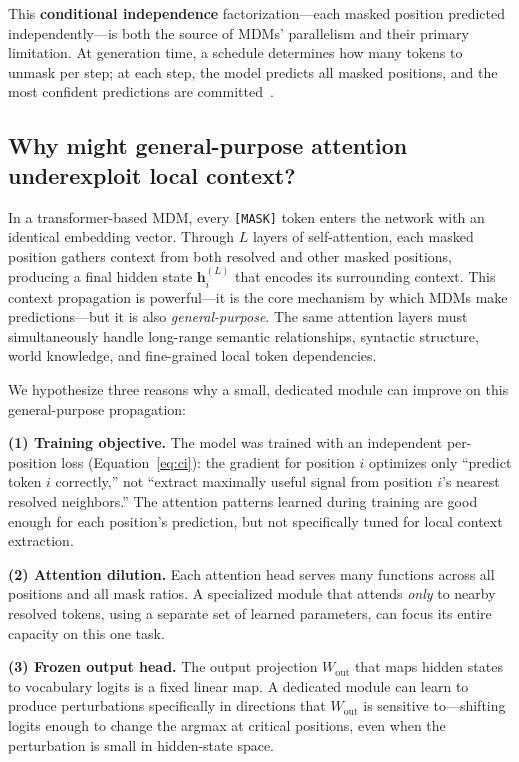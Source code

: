\documentclass{article} %
\begin{document}
This \textbf{conditional independence} factorization---each masked position predicted independently---is both the source of MDMs' parallelism and their primary limitation.
At generation time, a schedule determines how many tokens to unmask per step; at each step, the model predicts all masked positions, and the most confident predictions are committed~\citep{nie2025llada}.

\subsection{Why might general-purpose attention underexploit local context?}

In a transformer-based MDM, every \texttt{[MASK]} token enters the network with an identical embedding vector.
Through $L$ layers of self-attention, each masked position gathers context from both resolved and other masked positions, producing a final hidden state $\mathbf{h}_i^{(L)}$ that encodes its surrounding context.
This context propagation is powerful---it is the core mechanism by which MDMs make predictions---but it is also \emph{general-purpose}.
The same attention layers must simultaneously handle long-range semantic relationships, syntactic structure, world knowledge, and fine-grained local token dependencies.

We hypothesize three reasons why a small, dedicated module can improve on this general-purpose propagation:

\textbf{(1) Training objective.}
The model was trained with an independent per-position loss (Equation~\ref{eq:ci}): the gradient for position $i$ optimizes only ``predict token $i$ correctly,'' not ``extract maximally useful signal from position $i$'s nearest resolved neighbors.''
The attention patterns learned during training are good enough for each position's prediction, but not specifically tuned for local context extraction.

\textbf{(2) Attention dilution.}
Each attention head serves many functions across all positions and all mask ratios.
A specialized module that attends \emph{only} to nearby resolved tokens, using a separate set of learned parameters, can focus its entire capacity on this one task.

\textbf{(3) Frozen output head.}
The output projection $W_{\text{out}}$ that maps hidden states to vocabulary logits is a fixed linear map.
A dedicated module can learn to produce perturbations specifically in directions that $W_{\text{out}}$ is sensitive to---shifting logits enough to change the argmax at critical positions, even when the perturbation is small in hidden-state space.
\end{document}
